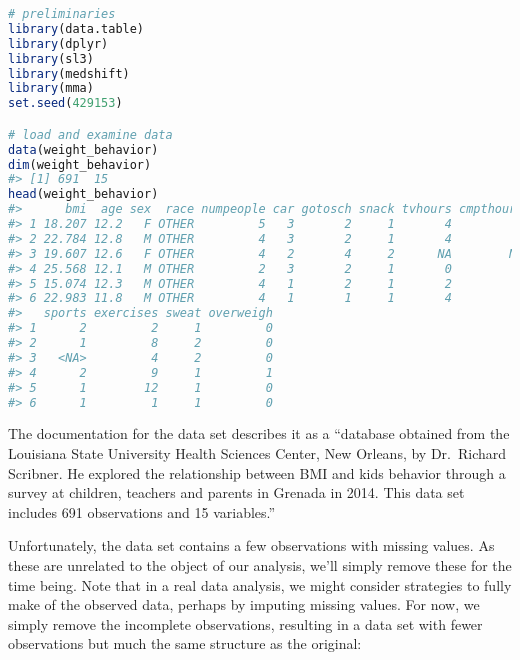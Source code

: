 \documentclass[
  12pt,
]{book}
\theoremstyle{definition}
\theoremstyle{definition}
\theoremstyle{definition}
\newcommand{\1}{\mathbbm{1}}
\begin{document}
\begin{lstlisting}[language=R]
# preliminaries
library(data.table)
library(dplyr)
library(sl3)
library(medshift)
library(mma)
set.seed(429153)

# load and examine data
data(weight_behavior)
dim(weight_behavior)
#> [1] 691  15
head(weight_behavior)
#>      bmi  age sex  race numpeople car gotosch snack tvhours cmpthours cellhours
#> 1 18.207 12.2   F OTHER         5   3       2     1       4         0         0
#> 2 22.784 12.8   M OTHER         4   3       2     1       4         2         0
#> 3 19.607 12.6   F OTHER         4   2       4     2      NA        NA        NA
#> 4 25.568 12.1   M OTHER         2   3       2     1       0         2         0
#> 5 15.074 12.3   M OTHER         4   1       2     1       2         1         3
#> 6 22.983 11.8   M OTHER         4   1       1     1       4         3         2
#>   sports exercises sweat overweigh
#> 1      2         2     1         0
#> 2      1         8     2         0
#> 3   <NA>         4     2         0
#> 4      2         9     1         1
#> 5      1        12     1         0
#> 6      1         1     1         0
\end{lstlisting}

The documentation for the data set describes it as a ``database obtained from the
Louisiana State University Health Sciences Center, New Orleans, by Dr.~Richard
Scribner. He explored the relationship between BMI and kids behavior through a
survey at children, teachers and parents in Grenada in 2014. This data set
includes 691 observations and 15 variables.''

Unfortunately, the data set contains a few observations with missing values. As
these are unrelated to the object of our analysis, we'll simply remove these for
the time being. Note that in a real data analysis, we might consider strategies
to fully make of the observed data, perhaps by imputing missing values. For now,
we simply remove the incomplete observations, resulting in a data set with fewer
observations but much the same structure as the original:
\end{document}
